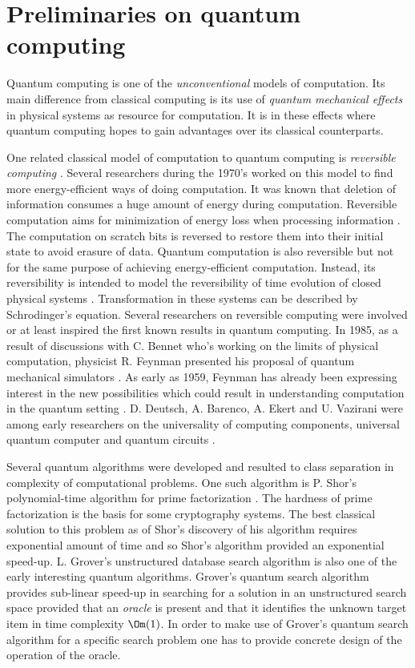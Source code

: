 \section{Preliminaries on quantum computing}
Quantum computing is one of the \textit{unconventional} models of computation. Its main difference from classical computing is its use of \textit{quantum mechanical effects} in physical systems as resource for computation. It is in these effects where quantum computing hopes to gain advantages over its classical counterparts.

One related classical model of computation to quantum computing is \textit{reversible computing} \cite{Bennett1973,Toffoli1980}. Several researchers during the 1970's worked on this model to find more energy-efficient ways of doing computation. It was known that deletion of information consumes a huge amount of energy during computation. Reversible computation aims for minimization of energy loss when processing information . The  computation on scratch bits is reversed to restore them into their initial state to avoid erasure of data. Quantum computation is also reversible but not for the same purpose of achieving energy-efficient computation. Instead, its reversibility is intended to model the reversibility of time evolution of closed physical systems \cite{C1Williams2011,C2Chuang2000}. Transformation in these systems can be described by Schrodinger's equation. Several researchers on reversible computing were involved or at least inspired the first known results in quantum computing. In 1985, as a result of discussions with C. Bennet who's working on the limits of physical computation, physicist R. Feynman presented his proposal of quantum mechanical simulators \cite{Feynman1982, Feynman1985}. As early as 1959, Feynman has already been expressing interest in the new possibilities which could result in understanding computation in the quantum setting \cite{Feynman1985}. D. Deutsch, A. Barenco, A. Ekert and U. Vazirani were among early researchers on the universality of computing components, universal quantum computer and quantum circuits \cite{Deutsch1985, Deutsch1989, Deutsch1995}.

Several quantum algorithms were developed and resulted to class separation in complexity of computational problems. One such algorithm is P. Shor's polynomial-time algorithm for prime factorization \cite{Shor1994}. The hardness of prime factorization is the basis for some cryptography systems. The best classical solution to this problem as of Shor's discovery of his algorithm requires exponential amount of time \cite{Lenstra1990} and so Shor's algorithm provided an exponential speed-up. L. Grover's unstructured database search algorithm \cite{Grover1996} is also one of the early interesting quantum algorithms. Grover's quantum search algorithm provides sub-linear speed-up in searching for a solution in an unstructured search space provided that an \textit{oracle} is present and that it identifies the unknown target item in time complexity $\Om(1)$. In order to make use of Grover's quantum search algorithm for a specific search problem one has to provide concrete design of the operation of the oracle.

